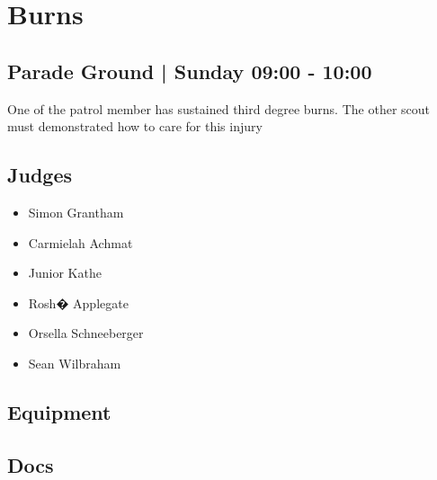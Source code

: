 \documentclass[10pt]{article}
\begin{document}
		\begin{minipage}{\linewidth}
		\setcounter{section}{31}
	\section{Burns }
	\subsection*{Parade Ground | Sunday 09:00 - 10:00}

	One of the patrol member has sustained third degree burns. The other scout must demonstrated how to care for this injury

	\begin{multicols}{2}
	\subsection*{\faUsers \: Judges}
	\begin{itemize}
			\item Simon Grantham
			\item Carmielah Achmat
			\item Junior Kathe
			\item Rosh� Applegate
			\item Orsella Schneeberger
			\item Sean Wilbraham
		\end{itemize}
	\columnbreak
	\subsection*{\faWrench \: Equipment}
	        \vfill\null
        \subsection*{\faFile \: Docs}
     	\end{multicols}


	\vspace{1cm}
	\end{minipage}
\end{document}
